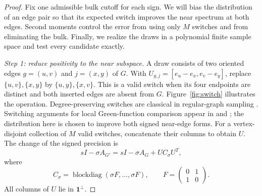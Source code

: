\begin{proof}
Fix one admissible bulk cutoff for each sign.  We will bias the distribution
of an edge pair so that its expected switch improves the near spectrum at both
edges.  Second moments control the error from using only $M$ switches and from
eliminating the bulk.  Finally, we realize the draws in a polynomial finite
sample space and test every candidate exactly.

\par\smallskip\noindent\textit{Step 1: reduce positivity to the near subspace.}\quad
A draw consists of two oriented edges $g=(u,v)$ and $j=(x,y)$ of $G$.
With
$U_{g,j}=[e_u-e_x,e_v-e_y]$, replace $\{u,v\},\{x,y\}$ by
$\{u,y\},\{x,v\}$.  This is a valid switch when its four endpoints
are distinct and both inserted edges are absent from $G$.
Figure~\ref{fig:switch} illustrates the operation.  Degree-preserving
switches are classical in regular-graph sampling \cite{MW1990}.
Switching arguments for local Green-function comparison appear in
\cite[Sections~7 and~11]{BHY2019} and \cite[Sections~3 and~5]{HY2024};
the distribution here is chosen to improve both signed near-edge forms.
For a vertex-disjoint collection of $M$ valid switches,
concatenate their columns to obtain $U$.  The change of the signed precision is
\[
 sI-\sigma A_{G'}=sI-\sigma A_G+UC_\sigma U^T,
\]
where
\[
 C_\sigma=\operatorname{blockdiag}(\sigma F,\ldots,\sigma F),
 \qquad F=\begin{pmatrix}0&1\\1&0\end{pmatrix}.
\]
All columns of $U$ lie in $\mathbf 1^\perp$.



\end{proof}
